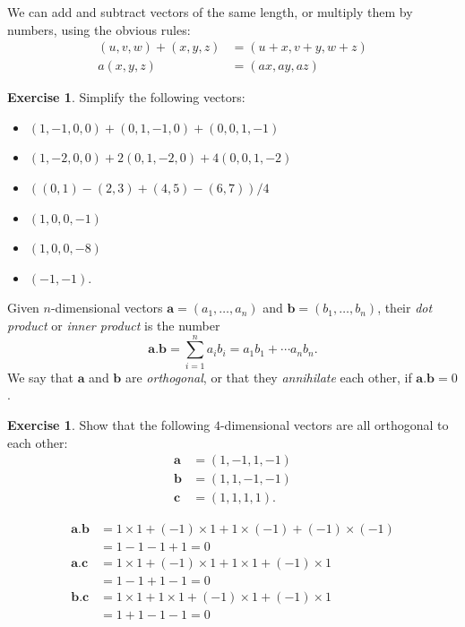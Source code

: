 \documentclass[a4paper]{book}
\newcommand{\PURPLE}[1]{{\color{purple}#1}}
\newcommand{\tm}        {\times}
\newcommand{\VEC}[1]    {\mathbf{#1}}
\renewcommand{\:}{\colon}
\newcommand{\DEFN}[1]{\PURPLE{\emph{#1}}}
\theoremstyle{definition}
\newtheorem{exercise}[theorem]{Exercise}
\renewenvironment{solution}{\SolutionInline}{\endSolutionInline}
\begin{document}
We can add and subtract vectors of the same length, or multiply them
by numbers, using the obvious rules:
\begin{align*}
 (u,v,w) + (x,y,z) &= (u+x,v+y,w+z) \\
 a(x,y,z)          &= (ax,ay,az)
\end{align*}
\begin{exercise}
 Simplify the following vectors:
 \begin{itemize}
 \item $(1,-1,0,0)+(0,1,-1,0)+(0,0,1,-1)$
 \item $(1,-2,0,0)+2(0,1,-2,0)+4(0,0,1,-2)$
 \item $((0,1)-(2,3)+(4,5)-(6,7))/4$
 \end{itemize}
\end{exercise}
\begin{solution}
 \begin{itemize}
 \item $(1,0,0,-1)$
 \item $(1,0,0,-8)$
 \item $(-1,-1)$.
 \end{itemize}
\end{solution}


Given $n$-dimensional vectors $\VEC{a}=(a_1,\dotsc,a_n)$ and
$\VEC{b}=(b_1,\dotsc,b_n)$, their \DEFN{dot product} or 
\DEFN{inner product} is the number
\[ \VEC{a}.\VEC{b} = \sum_{i=1}^n a_ib_i = a_1b_1 + \dotsb a_nb_n. \]
We say that $\VEC{a}$ and $\VEC{b}$ are \DEFN{orthogonal}, or that
they \DEFN{annihilate} each other, if $\VEC{a}.\VEC{b}=0$.
\begin{exercise}
 Show that the following $4$-dimensional vectors are all orthogonal to
 each other:
 \begin{align*}
  \VEC{a} &= (1,-1,1,-1) \\
  \VEC{b} &= (1,1,-1,-1) \\
  \VEC{c} &= (1,1,1,1).
 \end{align*}
\end{exercise}
\begin{solution}
 \begin{align*}
  \VEC{a}.\VEC{b} &= 1\tm 1 + (-1)\tm 1 + 1 \tm (-1) + (-1)\tm(-1) \\
                  &= 1 - 1 - 1 + 1 = 0 \\
  \VEC{a}.\VEC{c} &= 1\tm 1 + (-1)\tm 1 + 1 \tm 1 + (-1)\tm 1 \\
                  &= 1 - 1 + 1 - 1 = 0 \\
  \VEC{b}.\VEC{c} &= 1\tm 1 + 1\tm 1 + (-1) \tm 1 + (-1)\tm 1 \\
                  &= 1 + 1 - 1 - 1 = 0
 \end{align*}
\end{solution}
\end{document}
